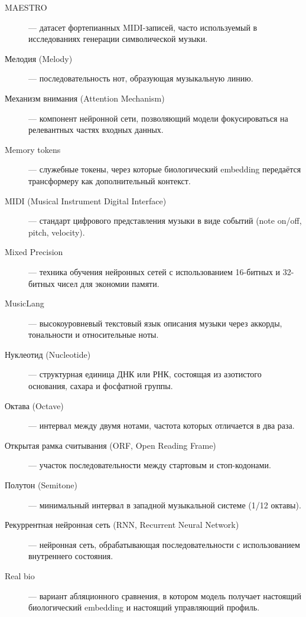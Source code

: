 \begin{description}
\item[MAESTRO] — датасет фортепианных MIDI-записей, часто используемый в исследованиях генерации символической музыки.

\item[Мелодия (Melody)] — последовательность нот, образующая музыкальную линию.

\item[Механизм внимания (Attention Mechanism)] — компонент нейронной сети, позволяющий модели фокусироваться на релевантных частях входных данных.

\item[Memory tokens] — служебные токены, через которые биологический embedding передаётся трансформеру как дополнительный контекст.

\item[MIDI (Musical Instrument Digital Interface)] — стандарт цифрового представления музыки в виде событий (note on/off, pitch, velocity).

\item[Mixed Precision] — техника обучения нейронных сетей с использованием 16-битных и 32-битных чисел для экономии памяти.

\item[MusicLang] — высокоуровневый текстовый язык описания музыки через аккорды, тональности и относительные ноты.

\item[Нуклеотид (Nucleotide)] — структурная единица ДНК или РНК, состоящая из азотистого основания, сахара и фосфатной группы.

\item[Октава (Octave)] — интервал между двумя нотами, частота которых отличается в два раза.

\item[Открытая рамка считывания (ORF, Open Reading Frame)] — участок последовательности между стартовым и стоп-кодонами.

\item[Полутон (Semitone)] — минимальный интервал в западной музыкальной системе (1/12 октавы).

\item[Рекуррентная нейронная сеть (RNN, Recurrent Neural Network)] — нейронная сеть, обрабатывающая последовательности с использованием внутреннего состояния.

\item[Real bio] — вариант абляционного сравнения, в котором модель получает настоящий биологический embedding и настоящий управляющий профиль.


\end{description}
